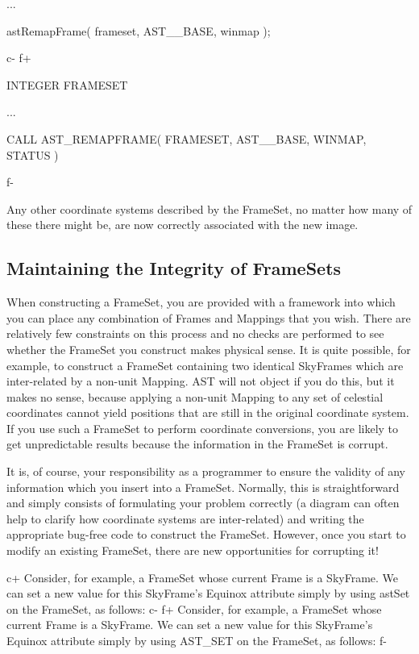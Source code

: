 \documentclass[twoside,11pt]{starlink}
\begin{document}
{\begin{terminalv}
...

astRemapFrame( frameset, AST__BASE, winmap );
\end{terminalv}
\normalsize
c-
f+
\small
\begin{terminalv}
      INTEGER FRAMESET

      ...

      CALL AST_REMAPFRAME( FRAMESET, AST__BASE, WINMAP, STATUS )
\end{terminalv}
\normalsize
f-

Any other coordinate systems described by the FrameSet, no matter how
many of these there might be, are now correctly associated with the
new image.

\subsection{\label{ss:framesetintegrity}Maintaining the Integrity of FrameSets}

When constructing a FrameSet, you are provided with a framework into
which you can place any combination of Frames and Mappings that you
wish. There are relatively few constraints on this process and no
checks are performed to see whether the FrameSet you construct makes
physical sense.  It is quite possible, for example, to construct a
FrameSet containing two identical SkyFrames which are inter-related by
a non-unit Mapping. AST will not object if you do this, but it makes
no sense, because applying a non-unit Mapping to any set of celestial
coordinates cannot yield positions that are still in the original
coordinate system.  If you use such a FrameSet to perform coordinate
conversions, you are likely to get unpredictable results because the
information in the FrameSet is corrupt.

It is, of course, your responsibility as a programmer to ensure the
validity of any information which you insert into a
FrameSet. Normally, this is straightforward and simply consists of
formulating your problem correctly (a diagram can often help to
clarify how coordinate systems are inter-related) and writing the
appropriate bug-free code to construct the FrameSet. However, once you
start to modify an existing FrameSet, there are new opportunities for
corrupting it!

c+
Consider, for example, a FrameSet whose current Frame is a
SkyFrame. We can set a new value for this SkyFrame's Equinox attribute
simply by using astSet on the FrameSet, as follows:
c-
f+
Consider, for example, a FrameSet whose current Frame is a
SkyFrame. We can set a new value for this SkyFrame's Equinox attribute
simply by using AST\_SET on the FrameSet, as follows:
f-

}
\end{document}
